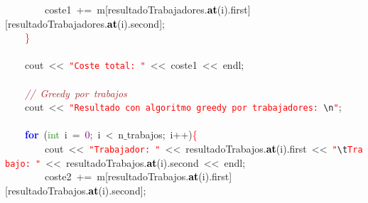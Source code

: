 \mbox{}\ \ \ \ \ \ \ \ coste1\ \textcolor{BrickRed}{+=}\ m\textcolor{BrickRed}{[}resultadoTrabajadores\textcolor{BrickRed}{.}\textbf{\textcolor{Black}{at}}\textcolor{BrickRed}{(}i\textcolor{BrickRed}{).}first\textcolor{BrickRed}{][}resultadoTrabajadores\textcolor{BrickRed}{.}\textbf{\textcolor{Black}{at}}\textcolor{BrickRed}{(}i\textcolor{BrickRed}{).}second\textcolor{BrickRed}{];}\  \\
\mbox{}\ \ \ \ \textcolor{Red}{\}} \\
\mbox{} \\
\mbox{}\ \ \ \ cout\ \textcolor{BrickRed}{\textless{}\textless{}}\ \texttt{\textcolor{Red}{"{}Coste\ total:\ "{}}}\ \textcolor{BrickRed}{\textless{}\textless{}}\ coste1\ \textcolor{BrickRed}{\textless{}\textless{}}\ endl\textcolor{BrickRed}{;} \\
\mbox{} \\
\mbox{}\ \ \ \ \textit{\textcolor{Brown}{//\ Greedy\ por\ trabajos\ \ }} \\
\mbox{}\ \ \ \ cout\ \textcolor{BrickRed}{\textless{}\textless{}}\ \texttt{\textcolor{Red}{"{}Resultado\ con\ algoritmo\ greedy\ por\ trabajadores:\ }}\texttt{\textcolor{CarnationPink}{\textbackslash{}n}}\texttt{\textcolor{Red}{"{}}}\textcolor{BrickRed}{;}\  \\
\mbox{} \\
\mbox{}\ \ \ \ \textbf{\textcolor{Blue}{for}}\ \textcolor{BrickRed}{(}\textcolor{ForestGreen}{int}\ i\ \textcolor{BrickRed}{=}\ \textcolor{Purple}{0}\textcolor{BrickRed}{;}\ i\ \textcolor{BrickRed}{\textless{}}\ n$\_$trabajos\textcolor{BrickRed}{;}\ i\textcolor{BrickRed}{++)}\textcolor{Red}{\{} \\
\mbox{}\ \ \ \ \ \ \ \ cout\ \textcolor{BrickRed}{\textless{}\textless{}}\ \texttt{\textcolor{Red}{"{}Trabajador:\ "{}}}\ \textcolor{BrickRed}{\textless{}\textless{}}\ resultadoTrabajos\textcolor{BrickRed}{.}\textbf{\textcolor{Black}{at}}\textcolor{BrickRed}{(}i\textcolor{BrickRed}{).}first\ \textcolor{BrickRed}{\textless{}\textless{}}\ \texttt{\textcolor{Red}{"{}}}\texttt{\textcolor{CarnationPink}{\textbackslash{}t}}\texttt{\textcolor{Red}{Trabajo:\ "{}}}\ \textcolor{BrickRed}{\textless{}\textless{}}\ resultadoTrabajos\textcolor{BrickRed}{.}\textbf{\textcolor{Black}{at}}\textcolor{BrickRed}{(}i\textcolor{BrickRed}{).}second\ \textcolor{BrickRed}{\textless{}\textless{}}\ endl\textcolor{BrickRed}{;}\  \\
\mbox{}\ \ \ \ \ \ \ \ coste2\ \textcolor{BrickRed}{+=}\ m\textcolor{BrickRed}{[}resultadoTrabajos\textcolor{BrickRed}{.}\textbf{\textcolor{Black}{at}}\textcolor{BrickRed}{(}i\textcolor{BrickRed}{).}first\textcolor{BrickRed}{][}resultadoTrabajos\textcolor{BrickRed}{.}\textbf{\textcolor{Black}{at}}\textcolor{BrickRed}{(}i\textcolor{BrickRed}{).}second\textcolor{BrickRed}{];}\  \\
